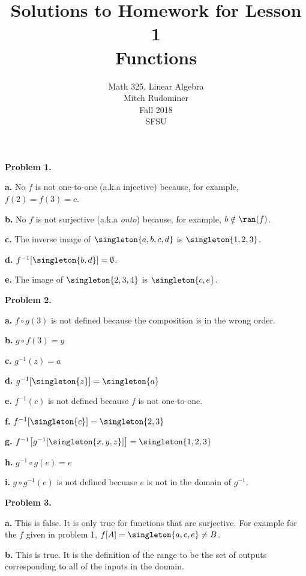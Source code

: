 \documentclass[oneside,12pt]{amsart}
\begin{document}
\title{Solutions to Homework for Lesson 1 \\ Functions}
\author{Math 325, Linear Algebra \\ Mitch Rudominer \\ Fall 2018 \\ SFSU }
\date{}

\maketitle


\textbf{Problem 1.}

\textbf{a.} No $f$ is not one-to-one (a.k.a injective) because, for example,
$f(2) = f(3) = c$.

\textbf{b.} No $f$ is not surjective (a.k.a \emph{onto}) because, for example,
$b\notin\ran(f)$.

\textbf{c.} The inverse image of $\singleton{a,b,c,d}$ is $\singleton{1,2,3}$.

\textbf{d.} $f^{-1}[\singleton{b, d}] = \emptyset$.


\textbf{e.} The image of $\singleton{2,3,4}$ is $\singleton{c, e}$.

\medskip

\textbf{Problem 2.}

\textbf{a.} $f\circ g (3)$ is not defined because the composition is in the wrong order.

\textbf{b.} $g\circ f (3) = y$


\textbf{c.} $g^{-1}(z) = a$


\textbf{d.} $g^{-1}[\singleton{z}] = \singleton{a}$


\textbf{e.} $f^{-1}(c)$ is not defined because $f$ is not one-to-one.


\textbf{f.} $f^{-1}[\singleton{c}] = \singleton{2,3}$


\textbf{g.} $f^{-1}\big[g^{-1}[\singleton{x, y, z}]\big] = \singleton{1,2,3}$


\textbf{h.} $g^{-1} \circ g (e) = e$

\textbf{i.} $g \circ g^{-1} (e)$ is not defined becuase $e$ is not in the domain of $g^{-1}$.

\medskip

\textbf{Problem 3.}

\textbf{a.} This is false. It is only true for functions that are surjective.
For example for the $f$ given in problem 1,  $f[A] = \singleton{a,c,e} \not= B$.

\textbf{b.} This is true. It is the definition of the range to be the set of
outputs corresponding to all of the inputs in the domain.
\end{document}
